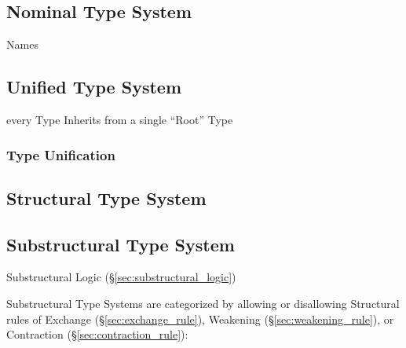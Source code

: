 \subsection{Nominal Type System}\label{sec:nominal_type_system}

Names



\subsection{Unified Type System}\label{sec:unified_type_system}

every Type Inherits from a single ``Root'' Type



\subsubsection{Type Unification}\label{sec:type_unification}




\subsection{Structural Type System}\label{sec:structural_type_system}

\subsection{Substructural Type System}
\label{sec:substructural_type}

Substructural Logic (\S\ref{sec:substructural_logic})

Substructural Type Systems are categorized by allowing or disallowing
Structural rules of Exchange (\S\ref{sec:exchange_rule}), Weakening
(\S\ref{sec:weakening_rule}), or Contraction
(\S\ref{sec:contraction_rule}):

